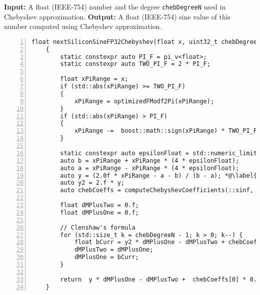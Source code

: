 
\begin{algorithm}
    \caption{Sine using Chebyshev Approximation}
    \begin{algorithmic}[1]
    \State \textbf{Input:} A float (IEEE-754) number and the degree \texttt{chebDegreeN} used in Chebyshev approximation.
    \State \textbf{Output:} A float (IEEE-754) sine value of this number computed using Chebyshev approximation.
\begin{lstlisting}[numbers=left]
    float nextSiliconSineFP32Chebyshev(float x, uint32_t chebDegreeN)
    {
        static constexpr auto PI_F = pi_v<float>;
        static constexpr auto TWO_PI_F = 2 * PI_F;

        float xPiRange = x;
        if (std::abs(xPiRange) >= TWO_PI_F)
        {
            xPiRange = optimizedFModf2Pi(xPiRange);
        }
        if (std::abs(xPiRange) > PI_F)
        {
            xPiRange -=  boost::math::sign(xPiRange) * TWO_PI_F;
        }

        static constexpr auto epsilonFloat = std::numeric_limits<float>::epsilon();
        auto b = xPiRange + xPiRange * (4 * epsilonFloat);
        auto a = xPiRange - xPiRange * (4 * epsilonFloat);
        auto y = (2.0f * xPiRange - a - b) / (b - a); *@\label{alg:sine_cheb:ln:scaling}@*
        auto y2 = 2.f * y;
        auto chebCoeffs = computeChebyshevCoefficients(::sinf, chebDegreeN, a, b);

        float dMPlusTwo = 0.f;
        float dMPlusOne = 0.f;

        // Clenshaw's formula
        for (std::size_t k = chebDegreeN - 1; k > 0; k--) {
            float bCurr = y2 * dMPlusOne - dMPlusTwo + chebCoeffs[k];
            dMPlusTwo = dMPlusOne;
            dMPlusOne = bCurr;
        }

        return  y * dMPlusOne - dMPlusTwo +  chebCoeffs[0] * 0.5;
    }

\end{lstlisting}
\end{algorithmic}
 \label{alg:sine_cheb_opt}
\end{algorithm}